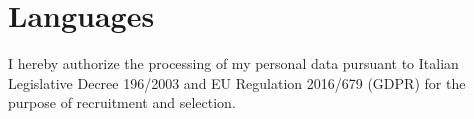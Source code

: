\section{Languages}
\resumeHeadingListStart{}
\resumeHeadingListEnd{}

\tiny{I hereby authorize the processing of my personal data pursuant to Italian Legislative Decree 196/2003 and EU Regulation 2016/679 (GDPR) for the purpose of recruitment and selection.}